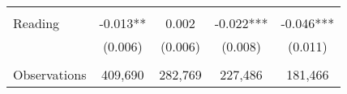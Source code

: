 {\begin{tabular}{lcccc}
&  &  & &  \\
Reading             &      -0.013** &       0.002   &      -0.022***&      -0.046***\\
                    &     (0.006)   &     (0.006)   &     (0.008)   &     (0.011)   \\
                    &               &               &               &               \\
Observations        &     409,690   &     282,769   &     227,486   &     181,466   \\
 

\bottomrule
\end{tabular}
}
